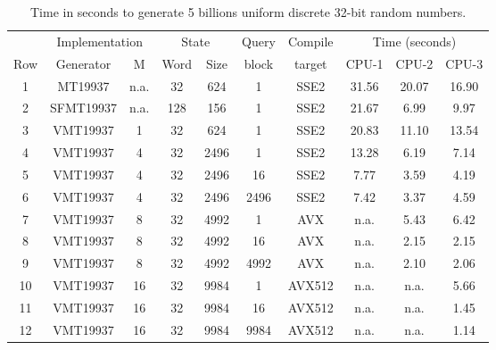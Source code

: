 \documentclass[preprint,1p,times]{elsarticle}
\begin{document}
			
			\begin{table}
				\begin{tabular}{c|c| c|c| c| c| c| c|c|c|} 
					\cline{2-10}
					&  \multicolumn{2}{c|}{Implementation}   & \multicolumn{2}{c|}{State} & Query & Compile & \multicolumn{3}{c|}{Time (seconds)} \\
					\cline{1-5} \cline{8-10} \multicolumn{1}{|c|}{Row}
					& Generator  & M   & Word & Size & block & target & CPU-1 & CPU-2 & CPU-3 \\
					\hline \multicolumn{1}{|c|}{1}
					& MT19937         &  n.a. & 32   & 624 & 1     & SSE2    & 31.56 & 20.07 & 16.90 \\ 
					\hline \multicolumn{1}{|c|}{2}
					& SFMT19937       &  n.a. & 128  & 156 & 1     & SSE2    & 21.67 & 6.99 & 9.97 \\
					\hline \multicolumn{1}{|c|}{3}
					& VMT19937    & 1   & 32   & 624 & 1     & SSE2    & 20.83  & 11.10 & 13.54 \\
					\hline \multicolumn{1}{|c|}{4}
					& VMT19937    & 4   & 32  & 2496 & 1     & SSE2    & 13.28  & 6.19 & 7.14 \\
					\hline \multicolumn{1}{|c|}{5}
					& VMT19937    & 4   & 32  & 2496 & 16    & SSE2    &  7.77  & 3.59 & 4.19 \\
					\hline \multicolumn{1}{|c|}{6}
					& VMT19937    & 4   & 32  & 2496 & 2496  & SSE2    &  7.42  & 3.37 & 4.59 \\
					\hline \multicolumn{1}{|c|}{7}
					& VMT19937     & 8   & 32  & 4992 & 1    & AVX     & n.a.   &5.43  & 6.42 \\
					\hline \multicolumn{1}{|c|}{8}
					& VMT19937     & 8   & 32  & 4992 & 16   & AVX     & n.a.   &2.15  & 2.15 \\
					\hline \multicolumn{1}{|c|}{9}
					& VMT19937     & 8   & 32  & 4992 & 4992 & AVX     & n.a.   &2.10 & 2.06 \\
					\hline \multicolumn{1}{|c|}{10}
					& VMT19937   &  16   & 32  & 9984 & 1    & AVX512  & n.a.   & n.a. & 5.66 \\
					\hline \multicolumn{1}{|c|}{11}
					& VMT19937   &  16 & 32    & 9984 & 16   & AVX512  & n.a.   & n.a. & 1.45 \\
					\hline \multicolumn{1}{|c|}{12}
					& VMT19937   &  16  & 32    & 9984 & 9984 & AVX512  & n.a.   & n.a. & 1.14 \\
					\hline
				\end{tabular}
				\caption{\label{tab:results} Time in seconds to generate 5 billions uniform discrete 32-bit random numbers.}
			\end{table}
			
\end{document}
